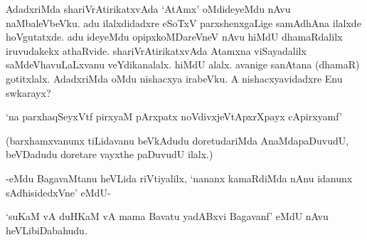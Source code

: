 AdadxriMda shariVrAtirikatxvAda `AtAmx' oMdideyeMdu nAvu naMbaleVbeVku. adu ilalxdidadxre eSoTxV parxshenxgaLige samAdhAna ilalxde hoVgutatxde. adu ideyeMdu opipxkoMDareVneV nAvu hiMdU dhamaRdalilx iruvudakekx athaRvide. shariVrAtirikatxvAda Atamxna viSayadalilx saMdeVhavuLaLxvanu veYdikanalalx. hiMdU alalx. avanige sanAtana (dhamaR) gotitxlalx. AdadxriMda oMdu nishacxya irabeVku. A nishacxyavidadxre Enu swkarayx?

\begin{shloka}
`na parxhaqSeyxVtf pirxyaM pArxpatx noVdivxjeVtApxrXpayx cApirxyamf'
\end{shloka}

(barxhamxvanunx tiLidavanu beVkAdudu doretudariMda AnaMdapaDuvudU, beVDadudu doretare vayxthe paDuvudU ilalx.)

-eMdu BagavaMtanu heVLida riVtiyalilx, `nananx kamaRdiMda nAnu idanunx sAdhisidedxVne' eMdU-

`suKaM vA duHKaM vA mama Bavatu yadABxvi Bagavanf' eMdU nAvu heVLibiDabahudu.

